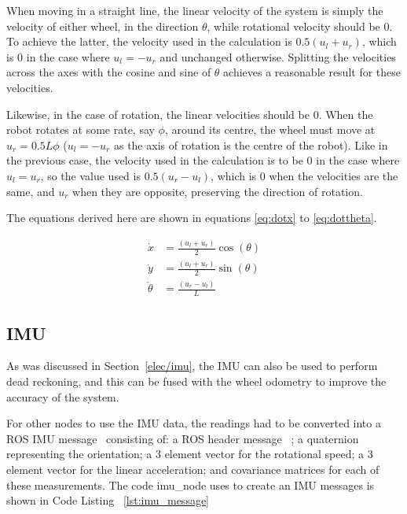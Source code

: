 When moving in a straight line, the linear velocity of the system is simply the
velocity of either wheel, in the direction $\theta$, while rotational velocity
should be $0$. To achieve the latter, the velocity used in the calculation is $0.5 (u_l + u_r)$, which is $0$ in the case where $u_l = -u_r$ and unchanged otherwise.
Splitting the velocities across the axes with the cosine and sine of $\theta$ achieves a reasonable result for these velocities.

Likewise, in the case of rotation, the linear velocities should be $0$. When the
robot rotates at some rate, say $\phi$, around its centre, the wheel must move at $u_r = 0.5 L \phi$ ($u_l = -u_r$ as the axis of rotation is the centre of the
robot). Like in the previous case, the velocity used in the calculation is to be 0
in the case where $u_l = u_r$, so the value
used is $0.5 (u_r - u_l)$, which is $0$ when the velocities are the same, and $u_r$ when they are opposite, preserving the direction of rotation. 

The equations derived here are shown in equations \ref{eq:dotx} to \ref{eq:dottheta}.


\begin{align}
\dot{x} & = \frac{(u_l + u_r)}{2} \cos(\theta) \label{eq:dotx} \\
\dot{y} & = \frac{(u_l + u_r)}{2} \sin(\theta) \label{eq:doty} \\
\dot{\theta} & = \frac{(u_r - u_l)}{L} \label{eq:dottheta}
\end{align}

\subsection{IMU}\label{soft/odometry/imu}

As was discussed in Section~\ref{elec/imu}, the IMU can also be used to 
perform dead reckoning, and this can be fused with the wheel odometry to 
improve the accuracy of the system.


For other nodes to use the IMU data, the readings had to be converted into 
a ROS IMU message~\cite{ROSIMUMsg} consisting of: a ROS header message~
\cite{ROSHeaderMsg}; a quaternion representing the orientation; a 3 
element vector for the rotational speed; a 3 element vector for the linear 
acceleration; and covariance matrices for each of these measurements. The 
code imu\_node uses to create an IMU messages is shown in Code Listing~
\ref{lst:imu_message}


